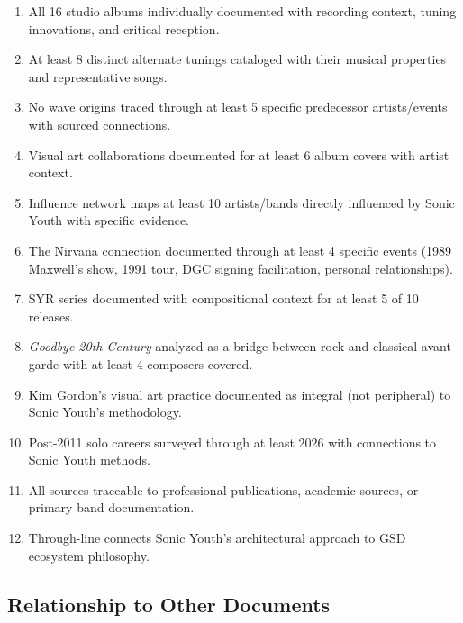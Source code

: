 \documentclass[11pt,letterpaper]{article}
\begin{document}
\begin{enumerate}[leftmargin=2em]
\item All 16 studio albums individually documented with recording context, tuning innovations, and critical reception.
\item At least 8 distinct alternate tunings cataloged with their musical properties and representative songs.
\item No wave origins traced through at least 5 specific predecessor artists/events with sourced connections.
\item Visual art collaborations documented for at least 6 album covers with artist context.
\item Influence network maps at least 10 artists/bands directly influenced by Sonic Youth with specific evidence.
\item The Nirvana connection documented through at least 4 specific events (1989 Maxwell's show, 1991 tour, DGC signing facilitation, personal relationships).
\item SYR series documented with compositional context for at least 5 of 10 releases.
\item \textit{Goodbye 20th Century} analyzed as a bridge between rock and classical avant-garde with at least 4 composers covered.
\item Kim Gordon's visual art practice documented as integral (not peripheral) to Sonic Youth's methodology.
\item Post-2011 solo careers surveyed through at least 2026 with connections to Sonic Youth methods.
\item All sources traceable to professional publications, academic sources, or primary band documentation.
\item Through-line connects Sonic Youth's architectural approach to GSD ecosystem philosophy.
\end{enumerate}

\subsection{Relationship to Other Documents}
\end{document}
